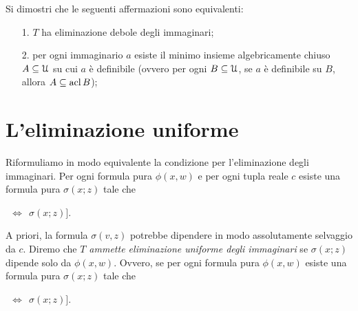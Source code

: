 % 

\begin{exercise}
Si dimostri che le seguenti affermazioni sono equivalenti:
\begin{itemize}
\item[1.] $T$ ha eliminazione debole degli immaginari;
\item[2.] per ogni immaginario $a$ esiste il minimo insieme algebricamente chiuso $A\subseteq\EuScript U$ su cui $a$ \`e definibile (ovvero per ogni $B\subseteq\EuScript U$, se $a$ \`e definibile su $B$, allora $A\subseteq\mathop{\rm acl} B$);
\end{itemize}
\end{exercise}


\section{L'eliminazione uniforme}

Riformuliamo in modo equivalente la condizione per l'eliminazione degli immaginari. Per ogni formula pura $\phi(x,w)$ e per ogni tupla reale $c$ esiste una formula pura $\sigma(x;z)$ tale che

\hspace*{30ex}\llap{$\E^{=1} z\;\A x\ \Big[\phi(x,c)$}$\ \ \iff\ \ \sigma(x;z)\Big]$.

A priori, la formula $\sigma(v,z)$ potrebbe dipendere in modo assolutamente selvaggio da $c$. Diremo che \emph{$T$ ammette eliminazione uniforme degli immaginari\/} se $\sigma(x;z)$ dipende solo da $\phi(x,w)$. Ovvero, se per ogni formula pura $\phi(x,w)$ esiste una formula pura $\sigma(x;z)$ tale che 

\noindent{}%
\hspace*{30ex}\llap{$\A w\;\E^{=1} z\;\A x\ \Big[\phi(x,w)$}$\ \  \iff\ \  \sigma(x;z)\Big]$.

